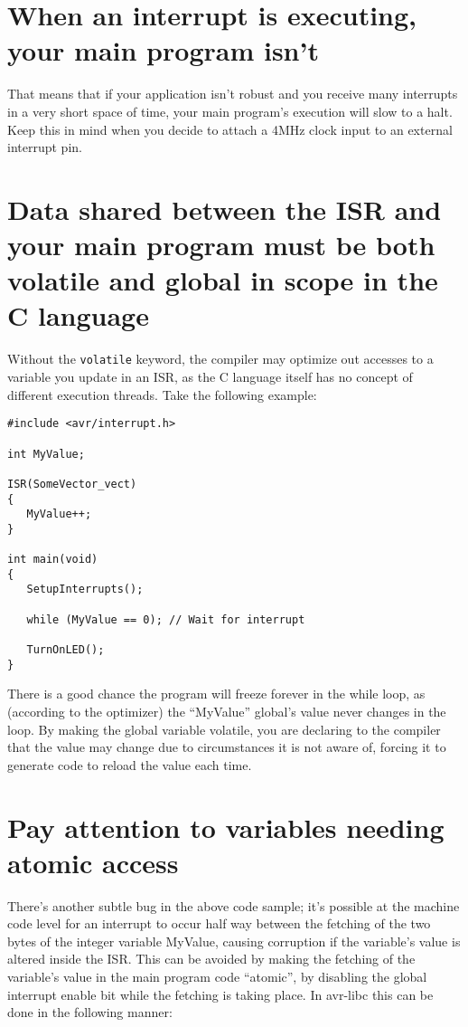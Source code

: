 \documentclass[a4paper,oneside,notitlepage]{book}
\begin{document}
\section{When an interrupt is executing, your main program isn't}
That means that if your application isn't robust and you receive many interrupts in a very short space of time, your main program's execution will slow to a halt. Keep this in mind when you decide to attach a 4MHz clock input to an external interrupt pin.

\section{Data shared between the ISR and your main program must be both volatile and global in scope in the C language}
Without the \texttt{volatile} keyword, the compiler may optimize out accesses to a variable you update in an ISR, as the C language itself has no concept of different execution threads. Take the following example:

\begin{center}
\begin{lstlisting}
#include <avr/interrupt.h>

int MyValue;

ISR(SomeVector_vect)
{
   MyValue++;
}

int main(void)
{
   SetupInterrupts();

   while (MyValue == 0); // Wait for interrupt

   TurnOnLED();
}
\end{lstlisting}
\end{center}

There is a good chance the program will freeze forever in the while loop, as (according to the optimizer) the ``MyValue'' global's value never changes in the loop. By making the global variable volatile, you are declaring to the compiler that the value may change due to circumstances it is not aware of, forcing it to generate code to reload the value each time.

\section{Pay attention to variables needing atomic access}
There's another subtle bug in the above code sample; it's possible at the machine code level for an interrupt to occur half way between the fetching of the two bytes of the integer variable MyValue, causing corruption if the variable's value is altered inside the ISR. This can be avoided by making the fetching of the variable's value in the main program code ``atomic'', by disabling the global interrupt enable bit while the fetching is taking place. In avr-libc this can be done in the following manner:
\end{document}
